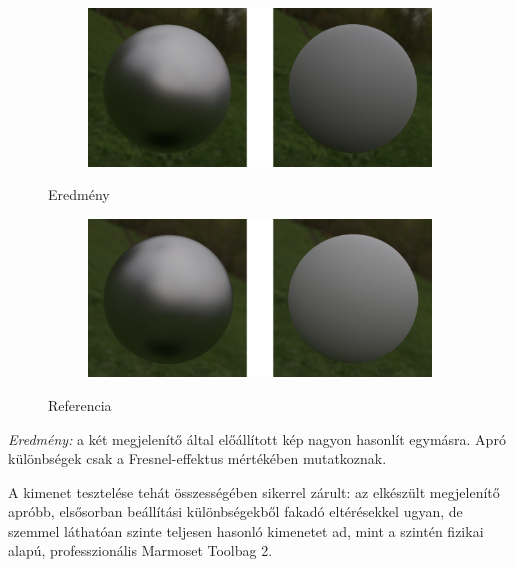 \begin{figure}[!ht]
    \centering
    \begin{subfigure}[b]{0.8\textwidth}
        \centering
        \includegraphics[width=\textwidth]{images/scr_metalness.png}
    \end{subfigure}
    \caption{Eredmény}
\end{figure}

\begin{figure}[!ht]
    \centering
    \begin{subfigure}[b]{0.8\textwidth}
        \centering
        \includegraphics[width=\textwidth]{images/marmoset_metalness.png}
    \end{subfigure}
    \caption{Referencia}
\end{figure}

\textit{Eredmény:} a két megjelenítő által előállított kép nagyon hasonlít egymásra. Apró különbségek csak a Fresnel-effektus mértékében mutatkoznak.

A kimenet tesztelése tehát összességében sikerrel zárult: az elkészült megjelenítő apróbb, elsősorban beállítási különbségekből fakadó eltérésekkel ugyan, de szemmel láthatóan szinte teljesen hasonló kimenetet ad, mint a szintén fizikai alapú, professzionális Marmoset Toolbag 2.

{}
 